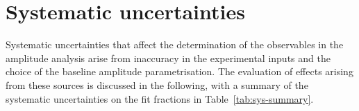 \section{Systematic uncertainties}
\label{sec:systematics}

Systematic uncertainties that affect the determination of the observables in the amplitude analysis arise from inaccuracy in the experimental inputs and the choice of the baseline amplitude parametrisation. 
The evaluation of effects arising from these sources is discussed in the following, with a summary of the systematic uncertainties on the fit fractions in Table~\ref{tab:sys-summary}. 

